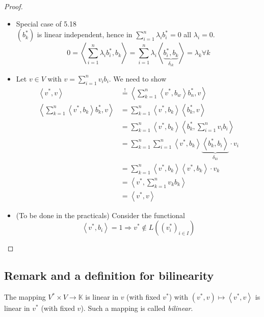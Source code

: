 \documentclass[a4paper,landscape,twocolumn]{article}
\newcommand\functional[1]{\left\langle{#1}\right\rangle}
\theoremstyle{definition}
\begin{document}
\begin{proof}
  \begin{itemize}
    \item Special case of 5.18 \\
      $(b^*_k)$ is linear independent, hence in $\sum_{i=1}^n \lambda_i b_i^* = 0$ all $\lambda_i = 0$.
      \[
        0 = \functional{\sum_{i=1}^n \lambda_i b_i^*, b_k}
          = \sum_{i=1}^n \lambda_i \functional{\underbrace{b_i^*, b_k}_{\delta_{ik}}}
          = \lambda_k \forall k
      \]
    \item Let $v \in V$ with $v = \sum_{i=1}^n v_i b_i$. We need to show
      \begin{align*}
        \functional{v^*, v} &\stackrel{!}{=} \functional{\sum_{k=1}^n \functional{v^*,b_w} b_n^*, v} \\
        \functional{\sum_{k=1}^n \functional{v^*, b_k} b_k^*, v}
            &= \sum_{k=1}^n \functional{v^*, b_k} \functional{b_k^*, v} \\
            &= \sum_{k=1}^n \functional{v^*, b_k} \functional{b_k^*, \sum_{i=1}^n v_i b_i} \\
            &= \sum_{k=1}^n \sum_{i=1}^n \functional{v^*, b_k} \underbrace{\functional{b_k^*, b_i}}_{\delta_{ki}} \cdot v_i \\
            &= \sum_{k=1}^n \functional{v^*, b_k} \functional{v^*, b_k} \cdot v_k \\
            &= \functional{v^*, \sum_{k=1}^n v_k b_k} \\
            &= \functional{v^*, v}
      \end{align*}
    \item (To be done in the practicals)
      Consider the functional
      \[ \functional{v^*, b_i} = 1 \Rightarrow v^* \not\in L((v_i^*)_{i \in I}) \]
  \end{itemize}
\end{proof}

\subsection{Remark and a definition for bilinearity}
%
The mapping $V^* \times V \to \mathbb K$ is linear in $v$ (with fixed $v^*$)
with $(v^*, v) \mapsto \functional{v^*, v}$ is linear in $v^*$ (with fixed $v$).
Such a mapping is called \emph{bilinear}.
\end{document}
